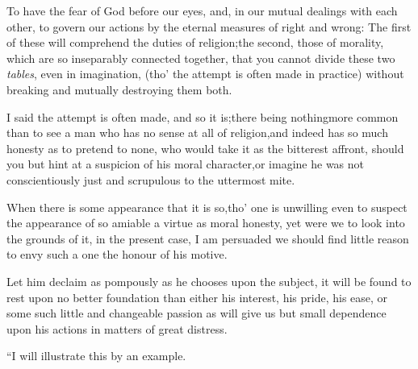 \documentclass{article}
\begin{document}
\begin{story}{To have the fear of God before our}
    eyes, and, in our mutual dealings with each other, to govern
    our actions by the eternal measures of right and
    wrong:\tsk\break
    The first of these will comprehend the duties of
    religion;\tsh the second, those of morality, which are so
    inseparably connected together, that you cannot divide these
    two \textit{tables}, even in imagination, (tho’ the attempt
    is often made in practice) without breaking and mutually
    destroying them both.  
\end{story}
\vspace\parskip
\begin{story}{I said the attempt is often made,} and so it
is;\tsh there being nothing\pb more common than to see a man who has
no sense at all of religion,\tsk and indeed has so much honesty as to
pretend to none, who would take it as the bitterest affront, should
you but hint at a suspicion of his moral character,\tsh\break or
imagine he was not conscientiously just and scrupulous to the
uttermost mite.
\end{story}
\vspace\parskip
\begin{story}{When there is some appearance that} it is
so,\tsk tho’ one is unwilling even to suspect the
appearance of so amiable a virtue as moral honesty, yet were we to
look into the grounds of it, in the present case, I am persuaded we
should find little reason to envy such a one the honour of his
motive.
\end{story}
\vspace\parskip
\begin{story}{Let him declaim as pompously as}
    he chooses upon the subject, it will\pb
    be found to rest upon no better foundation than
either his interest, his pride, his ease, or some such little and
changeable passion as will give us but small dependence upon his
actions in matters of great distress.
\end{story}
\vspace\parskip

“I will illustrate this by an example.
\end{document}
